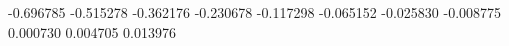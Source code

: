 -0.696785
-0.515278
-0.362176
-0.230678
-0.117298
-0.065152
-0.025830
-0.008775
0.000730
0.004705
0.013976
